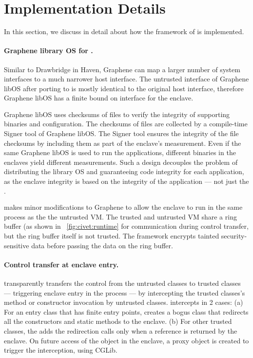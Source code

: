 \section{Implementation Details}
\label{sec:civet:impl}

In this section, we discuss in detail about how the framework of \sysname{}
is implemented. 


\paragraph{Graphene library OS for \sgx{}.}
Similar to Drawbridge in Haven, Graphene \libos{} can map a larger number of system interfaces
to a much narrower host interface.
The untrusted interface of Graphene libOS after porting to \sgx{}
is mostly identical to the original host interface,
therefore Graphene libOS has a finite  bound on interface for the enclave.

Graphene libOS uses checksums of files to verify the integrity of supporting binaries and configuration.
The checksums of files are collected by a compile-time Signer tool of Graphene libOS.
The Signer tool ensures the integrity of the file checksums
by including them as part of the enclave's measurement.
Even if the same Graphene libOS is used
to run the applications,
different binaries in the enclaves yield different measurements. 
Such a design decouples the problem of distributing the library OS
and guaranteeing code integrity for each application, as the enclave integrity is based on the integrity of the application --- not just the \libos{}.
 
\sysname{} makes minor modifications to Graphene \libos{} to allow
the enclave to run
in the same process as the the untrusted \java{} VM.
The trusted and untrusted VM share a ring buffer (as shown in ~\ref{fig:civet:runtime} for communication during control transfer,
but the ring buffer itself is not trusted. The \sysname{} framework encrypts tainted security-sensitive data before passing the data on the ring buffer.
 
\paragraph{Control transfer at enclave entry.}

\sysname{} transparently transfers the control from the untrusted classes to trusted classes --- triggering enclave entry in the process ---
by intercepting the trusted classes's method or constructor invocation by untrusted classes.
\sysname{} intercepts in 2 cases:
(a) For an entry class that has finite entry points,
\sysname{} creates a bogus class that redirects all the constructors and static methods to the enclave.
(b) For other trusted classes, the \sysname{} adds the redirection calls only when a reference is returned by the enclave. 
On future access of the object in the enclave, a proxy object is created to trigger the interception, using CGLib.

